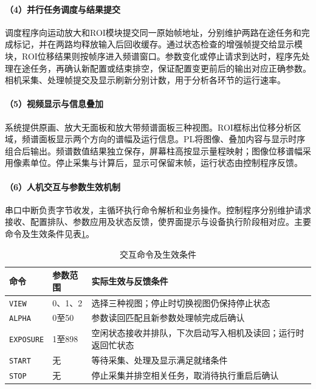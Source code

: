\paragraph{（4）并行任务调度与结果提交}
调度程序向运动放大和ROI模块提交同一原始帧地址，分别维护两路在途任务和完成标记，并在两路均释放输入后回收缓存。通过状态检查的增强帧提交给显示模块，ROI位移结果则按帧序进入频谱窗口。参数变化或停止请求到达时，程序先处理在途任务，再确认新配置或结束排空，保证配置变更前后的输出对应正确参数。相机采集、处理帧提交及显示刷新分别计数，用于分析各环节的运行速率。

\paragraph{（5）视频显示与信息叠加}
系统提供原画、放大无面板和放大带频谱面板三种视图。ROI框标出位移分析区域，频谱面板显示两个方向的谱幅及运行信息。PL将图像、叠加内容与显示时序组合后输出。频谱数值结果独立保存，屏幕柱高按显示量程映射；图像位移谱幅采用像素单位。停止采集与计算后，显示可保留末帧，运行状态由控制程序反馈。

\paragraph{（6）人机交互与参数生效机制}
串口中断负责字节收发，主循环执行命令解析和业务操作。控制程序分别维护请求接收、配置排队、参数应用及状态反馈，使界面提示与设备执行阶段相对应。主要命令及生效条件见表\ref{tab:hmi-commands}。

\begin{table}[htbp]
\centering\small
\caption{交互命令及生效条件}\label{tab:hmi-commands}
\begin{tabularx}{\linewidth}{@{}p{2.2cm}p{2.2cm}X@{}}
\toprule
命令 & 参数范围 & 实际生效与反馈条件 \\
\midrule
\texttt{VIEW} & 0、1、2 & 选择三种视图；停止时切换视图仍保持停止状态 \\
\texttt{ALPHA} & 0至50 & 参数读回匹配且新参数处理帧完成后确认 \\
\texttt{EXPOSURE} & 1至898 & 空闲状态接收并排队，下次启动写入相机及读回；运行时返回忙状态 \\
\texttt{START} & 无 & 等待采集、处理及显示满足就绪条件 \\
\texttt{STOP} & 无 & 停止采集并排空相关任务，取消待执行重启后确认 \\
\bottomrule
\end{tabularx}
\end{table}


